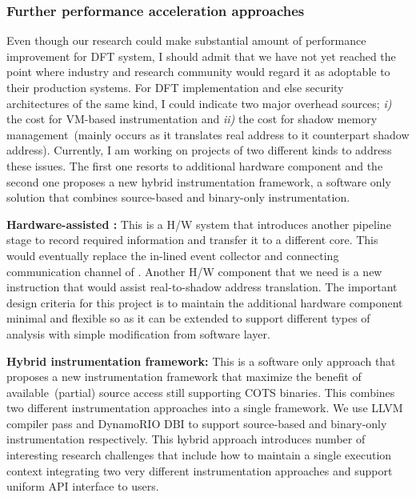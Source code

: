 \documentclass[letterpaper, 10pt]{article}
\begin{document}
\begin{small}
\subsubsection*{Further performance acceleration approaches}
%
Even though our research could make substantial amount of performance
improvement for DFT system, I should admit that we have not yet reached the
point where industry and research community would regard it as adoptable to
their production systems.
%
For DFT implementation and else security architectures of the same kind, I
could indicate two major overhead sources; {\it i)} the cost for VM-based
instrumentation and {\it ii)} the cost for shadow memory management~(mainly
occurs as it translates real address to it counterpart shadow address).
%
Currently, I am working on projects of two different kinds to address these
issues. The first one resorts to additional hardware component and the second
one proposes a new hybrid instrumentation framework, a software only solution
that combines source-based and binary-only instrumentation.

{\bf Hardware-assisted \SR:} 
%
%
This is a H/W system that introduces another pipeline stage to record required
information and transfer it to a different core. This would eventually replace
the in-lined event collector and connecting communication channel of \SR.
Another H/W component that we need is a new instruction that would assist
real-to-shadow address translation. The important design criteria for this
project is to maintain the additional hardware component minimal and flexible
so as it can be extended to support different types of analysis with simple
modification from software layer.
 
{\bf Hybrid instrumentation framework:} This is a software only approach that
proposes a new instrumentation framework that maximize the benefit of
available~(partial) source access still supporting COTS binaries.
%
This combines two different instrumentation approaches into a single framework.
We use LLVM compiler pass and DynamoRIO DBI to support source-based and
binary-only instrumentation respectively.
%
This hybrid approach introduces number of interesting research challenges that
include how to maintain a single execution context integrating two very
different instrumentation approaches and support uniform API interface to
users. 


\end{small}
\end{document}
